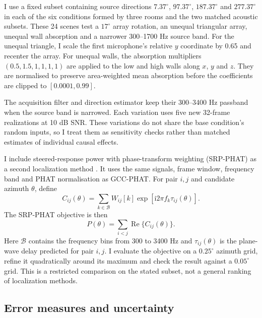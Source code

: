 \documentclass{edpsci}
\begin{document}
I use a fixed subset containing source directions $7.37^\circ$, $97.37^\circ$, $187.37^\circ$ and $277.37^\circ$ in each of the six conditions formed by three rooms and the two matched acoustic subsets. These 24 scenes test a $17^\circ$ array rotation, an unequal triangular array, unequal wall absorption and a narrower 300--1700 Hz source band. For the unequal triangle, I scale the first microphone's relative $y$ coordinate by 0.65 and recenter the array. For unequal walls, the absorption multipliers $(0.5,1.5,1,1,1,1)$ are applied to the low and high walls along $x$, $y$ and $z$. They are normalised to preserve area-weighted mean absorption before the coefficients are clipped to $[0.0001,0.99]$.

The acquisition filter and direction estimator keep their 300--3400 Hz passband when the source band is narrowed. Each variation uses five new 32-frame realizations at 10 dB SNR. These variations do not share the base condition's random inputs, so I treat them as sensitivity checks rather than matched estimates of individual causal effects.

I include steered-response power with phase-transform weighting (SRP-PHAT) as a second localization method \citep{dibiase}. It uses the same signals, frame window, frequency band and PHAT normalisation as GCC-PHAT. For pair $i,j$ and candidate azimuth $\theta$, define
\begin{equation}
	C_{ij}(\theta)
	=
	\sum_{k\in\mathcal{B}} W_{ij}[k]
	\exp\!\left[
	\mathrm{i}2\pi f_k\tau_{ij}(\theta)
	\right].
\end{equation}
The SRP-PHAT objective is then
\begin{equation}
	P(\theta)
	=
	\sum_{i<j}\operatorname{Re}
	\bigl\{C_{ij}(\theta)\bigr\}.
\end{equation}
Here $\mathcal{B}$ contains the frequency bins from 300 to 3400 Hz and $\tau_{ij}(\theta)$ is the plane-wave delay predicted for pair $i,j$. I evaluate the objective on a $0.25^\circ$ azimuth grid, refine it quadratically around its maximum and check the result against a $0.05^\circ$ grid. This is a restricted comparison on the stated subset, not a general ranking of localization methods.

\subsection{Error measures and uncertainty}
\end{document}
